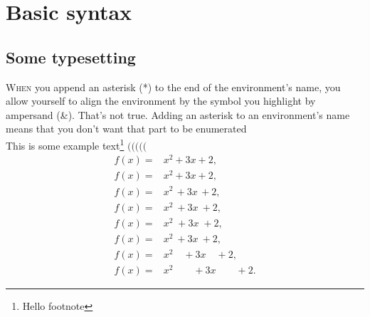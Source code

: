 \documentclass[11pt,a4paper]{report}
\theoremstyle{remark}
\theoremstyle{definition}
\begin{document}
		\noindent
		{ \hfil \noindent
			\hfil
		}
	
	\section*{Basic syntax}
	
		\subsection*{Some typesetting}
		
			\noindent
			\lettrine{W}{hen} you append an asterisk (*) to the end of the environment's name, you allow yourself to align the environment by the symbol you highlight by ampersand (\&). That's not true. Adding an asterisk to an environment's name means that you don't want that part to be enumerated \\
			This is some example text\footnote{\label{myfootnote}Hello footnote}
			$( \big( \Big( \bigg( \Bigg($
			\begin{align*}
				f(x) =& x^2\! +3x\! +2,
			\\
				f(x) =& x^2+3x+2,
			\\
				f(x) =& x^2\, +3x\, +2,
			\\
				f(x) =& x^2\: +3x\: +2,
			\\
				f(x) =& x^2\; +3x\; +2,
			\\
				f(x) =& x^2\ +3x\ +2,
			\\
				f(x) =& x^2\quad +3x\quad +2,
			\\
				f(x) =& x^2\qquad +3x\qquad +2.
			\end{align*}
			
\end{document}
